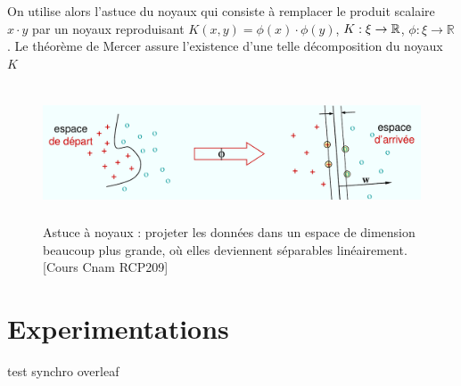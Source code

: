 \documentclass[a4paper,12pt,titlepage]{report}
\begin{document}
On utilise alors l'astuce du noyaux qui consiste à remplacer le produit scalaire $x \cdot y$
par un noyaux reproduisant $K(x,y) = \phi(x) \cdot \phi(y)$, $K :\xi \time \xi \rightarrow \mathbb{R}$, $\phi :\xi \rightarrow \mathbb{R}$  . Le théorème de Mercer assure l'existence d'une telle décomposition du noyaux $K$

\begin{figure}[!h]
		
		\includegraphics[height = 4cm, keepaspectratio]{graphes/mnoyaux05.png}
		\caption{Astuce à noyaux : projeter les données dans un espace de dimension beaucoup plus grande, où elles deviennent séparables linéairement.[Cours Cnam RCP209]}
\end{figure}

\chapter{Experimentations}

test synchro overleaf
\end{document}
